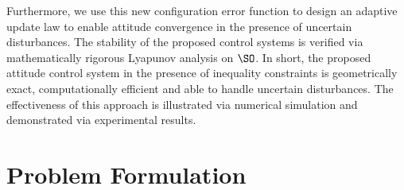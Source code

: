 Furthermore, we use this new configuration error function to design an adaptive update law to enable attitude convergence in the presence of uncertain disturbances. 
The stability of the proposed control systems is verified via mathematically rigorous Lyapunov analysis on $\SO$.  
In short, the proposed attitude control system in the presence of inequality constraints is geometrically exact, computationally efficient and able to handle uncertain disturbances. 
The effectiveness of this approach is illustrated via numerical simulation and demonstrated via experimental results.%

\section{Problem Formulation}\label{sec:prob_form}
